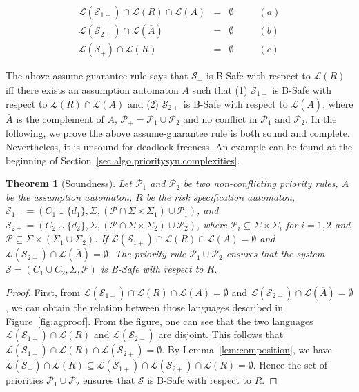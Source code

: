 \documentclass[10pt, a4paper, onecolumn, conference, compsocconf]{IEEEtran}
\newtheorem{theo}{Theorem}
\begin{document}
\[
\begin{array}{rcll}
\mathcal{L}(\mathcal{S}_{1+})\cap \mathcal{L}(R) \cap \mathcal{L}(A)  &=& \emptyset &\ \ \ \ \ \ \ \ (a)\\
\mathcal{L}(\mathcal{S}_{2+})\cap \mathcal{L}(\overline{A})&=&\emptyset&\ \ \ \ \ \ \ \ (b)\\
\hline
\mathcal{L}(\mathcal{S}_{+})\cap \mathcal{L}(R) &=& \emptyset &\ \ \ \ \ \ \ \ (c)
\end{array}
\]

The above assume-guarantee rule says that $\mathcal{S}_{+}$ is B-Safe with respect to $\mathcal{L}(R)$ iff there exists an assumption automaton $A$ such that (1) $\mathcal{S}_{1+}$ is B-Safe with respect to $\mathcal{L}(R) \cap \mathcal{L}(A)$ and (2) $\mathcal{S}_{2+}$ is B-Safe with respect to $\mathcal{L}(\overline{A})$, where $\overline{A}$ is the complement of $A$, $\mathcal{P}_{+} = \mathcal{P}_{1} \cup \mathcal{P}_{2}$ and no conflict in $\mathcal{P}_{1}$ and $\mathcal{P}_{2}$. In the following, we prove the above assume-guarantee rule is both sound and complete. Nevertheless, it is unsound for deadlock freeness. An example can be found at the beginning of Section~\ref{sec.algo.prioritysyn.complexities}.

\begin{theo}[Soundness]\label{the:ag-sound}
Let $\mathcal{P}_{1}$ and $\mathcal{P}_{2}$ be two non-conflicting priority rules, $A$ be the assumption automaton, $R$ be the risk specification automaton, $\mathcal{S}_{1+} = (C_1 \cup \{d_1\}, \Sigma, (\mathcal{P}\cap \Sigma\times\Sigma_1) \cup \mathcal{P}_1)$, and $\mathcal{S}_{2+} = (C_2\cup \{d_2\} , \Sigma, (\mathcal{P}\cap \Sigma\times\Sigma_2) \cup \mathcal{P}_2)$, where $\mathcal{P}_i  \subseteq \Sigma \times \Sigma_i$ for $i=1,2$ and $\mathcal{P} \subseteq \Sigma \times (\Sigma_1 \cup \Sigma_2)$. If $\mathcal{L}(\mathcal{S}_{1+})\cap \mathcal{L}(R) \cap \mathcal{L}(A)=\emptyset$ and $\mathcal{L}(\mathcal{S}_{2+})\cap \mathcal{L}(\overline{A})=\emptyset$. The priority rule $\mathcal{P}_{1} \cup \mathcal{P}_{2}$ ensures that the system $\mathcal{S} = (C_1 \cup C_2 , \Sigma, \mathcal{P})$ is B-Safe with respect to $R$.
\end{theo}

\begin{proof}
First, from $\mathcal{L}(\mathcal{S}_{1+})\cap \mathcal{L}(R) \cap \mathcal{L}(A)=\emptyset$ and $\mathcal{L}(\mathcal{S}_{2+})\cap \mathcal{L}(\overline{A})=\emptyset$, we can obtain the relation between those languages described in Figure~\ref{fig:agproof}. From the figure, one can see that the two languages $\mathcal{L}(\mathcal{S}_{1+})\cap \mathcal{L}(R)$ and $\mathcal{L}(\mathcal{S}_{2+})$ are disjoint. This follows that $\mathcal{L}(\mathcal{S}_{1+})\cap \mathcal{L}(R) \cap \mathcal{L}(\mathcal{S}_{2+}) =\emptyset$. By Lemma~\ref{lem:composition}, we have $\mathcal{L}(\mathcal{S}_+)\cap \mathcal{L}(R)\subseteq \mathcal{L}(\mathcal{S}_{1+})\cap \mathcal{L}(\mathcal{S}_{2+})\cap \mathcal{L}(R) =\emptyset$. Hence the set of priorities $\mathcal{P}_{1} \cup \mathcal{P}_{2}$ ensures that $\mathcal{S}$ is B-Safe with respect to $R$.
\end{proof}
\end{document}

